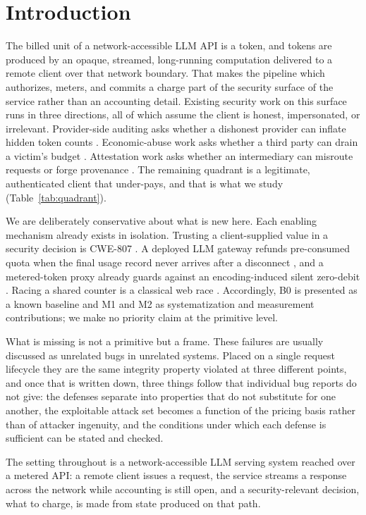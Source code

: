 \documentclass[preprint,3p,authoryear,12pt]{elsarticle}
\begin{document}
\section{Introduction}
The billed unit of a network-accessible LLM API is a token, and tokens are produced by
an opaque, streamed, long-running computation delivered to a remote client over that
network boundary. That makes the pipeline which authorizes, meters, and commits a
charge part of the security surface of the service rather than an accounting detail. Existing security
work on this surface runs in three directions, all of which assume the client is honest,
impersonated, or irrelevant. Provider-side auditing asks whether a dishonest provider can
inflate hidden token counts \citep{coin,invisible,tokeninflation}. Economic-abuse work asks
whether a third party can drain a victim's budget \citep{dow,dowreview,owasp,llmjacking}.
Attestation work asks whether an intermediary can misroute requests or forge provenance
\citep{aex,gwprov}. The remaining quadrant is a legitimate, authenticated client that
under-pays, and that is what we study (Table~\ref{tab:quadrant}).

We are deliberately conservative about what is new here. Each enabling mechanism already
exists in isolation. Trusting a client-supplied value in a security decision is CWE-807
\citep{cwe807}. A deployed LLM gateway refunds pre-consumed quota when the final usage
record never arrives after a disconnect \citep{newapi5235}, and a metered-token proxy
already guards against an encoding-induced silent zero-debit \citep{aperture247}. Racing a
shared counter is a classical web race \citep{kettle}. Accordingly, B0 is presented as a
known baseline and M1 and M2 as systematization and measurement contributions; we make no
priority claim at the primitive level.

What is missing is not a primitive but a frame. These failures are usually discussed as
unrelated bugs in unrelated systems. Placed on a single request lifecycle they are the
same integrity property violated at three different points, and once that is written
down, three things follow that individual bug reports do not give: the defenses separate
into properties that do not substitute for one another, the exploitable attack set becomes
a function of the pricing basis rather than of attacker ingenuity, and the conditions
under which each defense is sufficient can be stated and checked.

The setting throughout is a network-accessible LLM serving system reached over a
metered API: a remote client issues a request, the service streams a response across
the network while accounting is still open, and a security-relevant decision, what
to charge, is made from state produced on that path.
\end{document}
